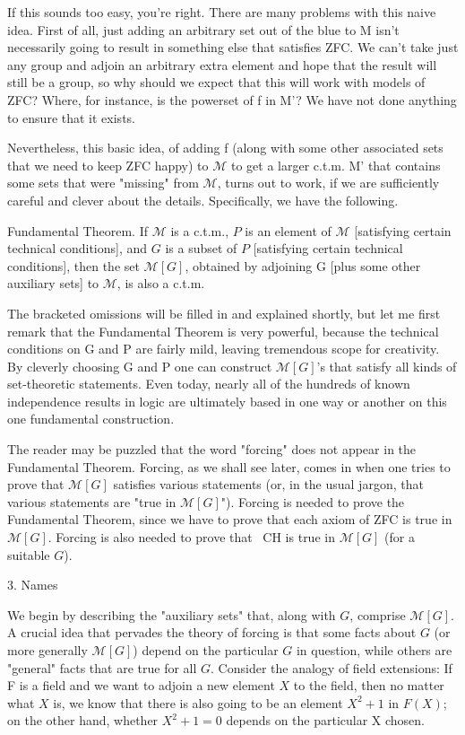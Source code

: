 \documentclass[10pt]{article}
\theoremstyle{definition}
\begin{document}
If this sounds too easy, you're right.  There are many problems with this
naive idea.  First of all, just adding an arbitrary set out of the blue to M
isn't necessarily going to result in something else that satisfies ZFC.  We
can't take just any group and adjoin an arbitrary extra element and hope
that the result will still be a group, so why should we expect that this
will work with models of ZFC?  Where, for instance, is the powerset of f in
M'?  We have not done anything to ensure that it exists.

Nevertheless, this basic idea, of adding f (along with some other associated
sets that we need to keep ZFC happy) to $\mathcal{M}$ to get a larger c.t.m. M' that
contains some sets that were "missing" from $\mathcal M$, turns out to work, if we are
sufficiently careful and clever about the details.  Specifically, we have
the following.

Fundamental Theorem.  If $\mathcal{M}$ is a c.t.m., $P$ is an element of $\mathcal{M}$ [satisfying
certain technical conditions], and $G$ is a subset of $P$ [satisfying certain
technical conditions], then the set $\mathcal{M}[G]$, obtained by adjoining G [plus some
other auxiliary sets] to $\mathcal M$, is also a c.t.m.

The bracketed omissions will be filled in and explained shortly, but let me
first remark that the Fundamental Theorem is very powerful, because the
technical conditions on G and P are fairly mild, leaving tremendous scope
for creativity.  By cleverly choosing G and P one can construct $\mathcal{M}[G]$'s that
satisfy all kinds of set-theoretic statements.  Even today, nearly all of
the hundreds of known independence results in logic are ultimately based in
one way or another on this one fundamental construction.

The reader may be puzzled that the word "forcing" does not appear in the
Fundamental Theorem.  Forcing, as we shall see later, comes in when one
tries to prove that $\mathcal{M}[G]$ satisfies various statements (or, in the usual
jargon, that various statements are "true in $\mathcal{M}[G]$").  Forcing is needed to
prove the Fundamental Theorem, since we have to prove that each axiom of ZFC
is true in $\mathcal{M}[G]$.  Forcing is also needed to prove that ~CH is true in $\mathcal{M}[G]$
(for a suitable $G$).


3. Names

We begin by describing the "auxiliary sets" that, along with $G$, comprise
$\mathcal M[G]$.  A crucial idea that pervades the theory of forcing is that some facts
about $G$ (or more generally $\mathcal{M}[G]$) depend on the particular $G$ in question,
while others are "general" facts that are true for all $G$.  Consider the
analogy of field extensions: If F is a field and we want to adjoin a new
element $X$ to the field, then no matter what $X$ is, we know that there is
also going to be an element $X^2 + 1$ in $F(X)$; on the other hand, whether
$X^2 + 1 = 0$ depends on the particular X chosen.
\end{document}
